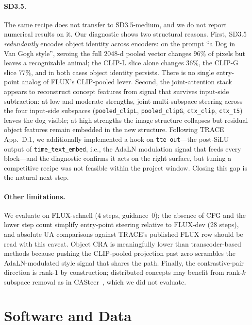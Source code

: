 \documentclass{article}
\begin{document}
\paragraph{SD3.5.} The same recipe does not transfer to
SD3.5-medium, and we do not report numerical results on it. Our
diagnostic shows two structural reasons. First, SD3.5
\emph{redundantly} encodes object identity across encoders: on the
prompt ``a Dog in Van Gogh style'', zeroing the full $2048$-d pooled
vector changes $96\%$ of pixels but leaves a recognizable animal;
the CLIP-L slice alone changes $36\%$, the CLIP-G slice $77\%$, and
in both cases object identity persists. There is no single
entry-point analog of FLUX's CLIP-pooled lever. Second, the
joint-attention stack appears to reconstruct concept features from
signal that survives input-side subtraction: at low and moderate
strengths, joint multi-subspace steering across the four input-side
subspaces (\texttt{pooled\_clipL}, \texttt{pooled\_clipG},
\texttt{ctx\_clip}, \texttt{ctx\_t5}) leaves the dog visible; at high
strengths the image structure collapses but residual object features
remain embedded in the new structure. Following TRACE App.~D.1, we
additionally implemented a hook on \texttt{tte\_out}---the post-SiLU
output of \texttt{time\_text\_embed}, i.e., the AdaLN modulation
signal that feeds every block---and the diagnostic confirms it acts
on the right surface, but tuning a competitive recipe was not
feasible within the project window. Closing this gap is the natural
next step.

\paragraph{Other limitations.} We evaluate on FLUX-schnell ($4$
steps, guidance~$0$); the absence of CFG and the lower step count
simplify entry-point steering relative to FLUX-dev ($28$ steps), and
absolute UA comparisons against TRACE's published FLUX row should be
read with this caveat. Object CRA is meaningfully lower than
transcoder-based methods because pushing the CLIP-pooled projection
past zero scrambles the AdaLN-modulated style signal that shares the
path. Finally, the contrastive-pair direction is rank-$1$ by
construction; distributed concepts may benefit from rank-$k$
subspace removal as in CASteer~\cite{khrulkov2024casteer}, which we
did not evaluate.

\section*{Software and Data}
\end{document}
